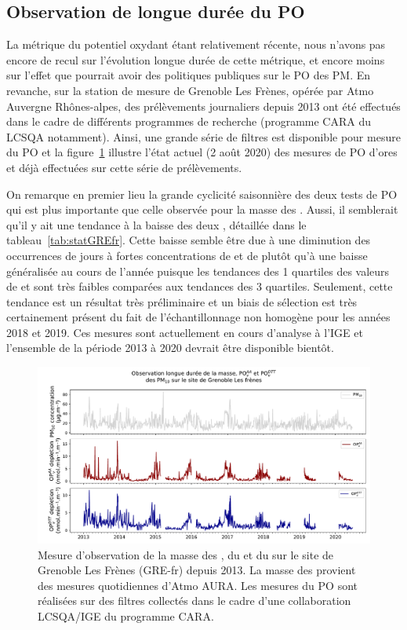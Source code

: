 \clearpage
\subsection{Observation de longue durée du PO}%
\label{sub:observation_longue_duree}

La métrique du potentiel oxydant étant relativement récente, nous n'avons pas encore de
recul sur l'évolution longue durée de cette métrique, et encore moins sur l'effet que
pourrait avoir des politiques publiques sur le PO des PM. En revanche, sur la station de
mesure de Grenoble Les Frènes, opérée par Atmo Auvergne Rhônes-alpes, des prélèvements
journaliers depuis 2013 ont été effectués dans le cadre de différents programmes de
recherche (programme CARA du LCSQA notamment). Ainsi, une grande série de filtres est
disponible pour mesure du PO et la figure~\ref{fig:TSGREfr} illustre l'état actuel (2
août 2020) des mesures de PO d'ores et déjà effectuées sur cette série de prélèvements.

On remarque en premier lieu la grande cyclicité saisonnière des deux tests de PO 
qui est plus importante que celle observée pour la masse des \PMdix.
Aussi, il semblerait qu'il y ait une tendance à la baisse des deux \POv, détaillée dans le
tableau~\ref{tab:statGREfr}. Cette baisse semble être due à une diminution des occurrences
de jours à fortes concentrations de \PMdix{} et de \POv{} plutôt qu'à une baisse
généralisée au cours de l'année puisque les tendances des 1\iers{} quartiles des valeurs de
\POv{} et \PMdix{} sont très faibles comparées aux tendances des 3\iemes{} quartiles.
Seulement, cette tendance est un résultat très préliminaire et un biais de sélection est
très certainement présent du fait de l'échantillonnage non homogène pour les années 2018
et 2019.
Ces mesures sont actuellement en cours d'analyse à l'IGE et l'ensemble de la période 2013
à 2020 devrait être disponible bientôt.

\begin{figure}[ht]
    \centering
    \includegraphics[width=1.0\linewidth]{figures/chapter04/frenes.pdf}
    \caption[Mesure d'observation de la masse des \PMdix, du \POAA{} et du \PODTT{} sur le
    site de Grenoble Les Frènes (GRE-fr) depuis 2013]{Mesure d'observation de la masse des \PMdix, du \POAA{} et du \PODTT{} sur le
    site de Grenoble Les Frènes (GRE-fr) depuis 2013. La masse des \PMdix{} provient des
mesures quotidiennes d'Atmo AURA.  Les mesures du PO sont réalisées sur des filtres
collectés dans le cadre d'une collaboration LCSQA/IGE du programme CARA.}%
\label{fig:TSGREfr}
\end{figure}

